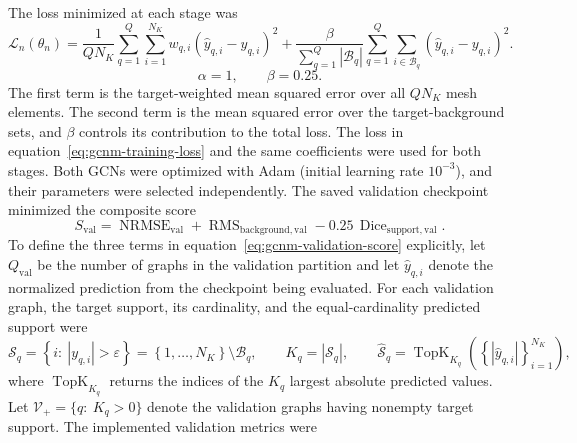 \documentclass[11pt]{article}
\begin{document}
The loss minimized at each stage was
\begingroup
\small
\begin{equation}
    \mathcal L_n(\theta_n)
    =
    \frac{1}{QN_K}\sum_{q=1}^{Q}\sum_{i=1}^{N_K}
    w_{q,i}\left(\widehat y_{q,i}-y_{q,i}\right)^2
    +
    \frac{\beta}{\sum_{q=1}^{Q}|\mathcal B_q|}
    \sum_{q=1}^{Q}\sum_{i\in\mathcal B_q}
    \left(\widehat y_{q,i}-y_{q,i}\right)^2.
\label{eq:gcnm-training-loss}
\end{equation}
\endgroup
\begin{equation*}
    \alpha=1,
    \qquad
    \beta=0.25.
\end{equation*}
The first term is the target-weighted mean squared error over all $QN_K$ mesh elements.
The second term is the mean squared error over the target-background sets, and $\beta$ controls its contribution to the total loss.
The loss in equation~\eqref{eq:gcnm-training-loss} and the same coefficients were used for both stages.
Both GCNs were optimized with Adam (initial learning rate $10^{-3}$), and their parameters were selected independently.
The saved validation checkpoint minimized the composite score
\begin{equation}
    S_{\mathrm{val}}
    =
    \operatorname{NRMSE}_{\mathrm{val}}
    +
    \operatorname{RMS}_{\mathrm{background,val}}
    -
    0.25\,\operatorname{Dice}_{\mathrm{support,val}}.
\label{eq:gcnm-validation-score}
\end{equation}
To define the three terms in equation~\eqref{eq:gcnm-validation-score} explicitly, let $Q_{\mathrm{val}}$ be the number of graphs in the validation partition and let $\widehat y_{q,i}$ denote the normalized prediction from the checkpoint being evaluated.
For each validation graph, the target support, its cardinality, and the equal-cardinality predicted support were
\begin{equation*}
    \mathcal S_q
    =
    \left\{i:\ |y_{q,i}|>\varepsilon\right\}
    =
    \left\{1,\ldots,N_K\right\}\setminus\mathcal B_q,
    \qquad
    K_q=|\mathcal S_q|,
    \qquad
    \widehat{\mathcal S}_q
    =
    \operatorname{TopK}_{K_q}
    \left(\left\{|\widehat y_{q,i}|\right\}_{i=1}^{N_K}\right),
\end{equation*}
where $\operatorname{TopK}_{K_q}$ returns the indices of the $K_q$ largest absolute predicted values.
Let $\mathcal V_{+}=\{q:\ K_q>0\}$ denote the validation graphs having nonempty target support.
The implemented validation metrics were
\end{document}

